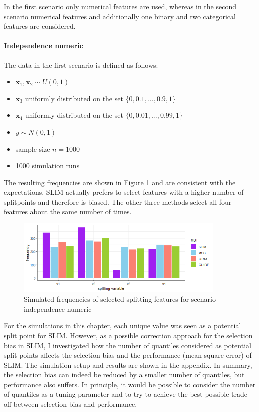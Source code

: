 In the first scenario only numerical features are used, whereas in the second scenario numerical features and additionally one binary and two categorical features are considered.

\paragraph{Independence numeric\\}
The data in the first scenario is defined as follows:
\begin{itemize}
    \item $\textbf{x}_{1}, \textbf{x}_{2} \sim U(0,1)$
    \item $\textbf{x}_3$ uniformly distributed on the set $\{0, 0.1,..., 0.9, 1\}$
    \item $\textbf{x}_4$ uniformly distributed on the set $\{0, 0.01,..., 0.99, 1\}$
    \item $y \sim N(0,1)$
    \item sample size $n = 1000$
    \item 1000 simulation runs
\end{itemize}

The resulting frequencies are shown in Figure \ref{fig:selection_bias_independence_numeric} and are consistent with the expectations. SLIM actually prefers to select features with a higher number of splitpoints and therefore is biased. The other three methods select all four features about the same number of times.

\begin{figure}[!htb]
    \centering
    \includegraphics[width=10cm]{Figures/simulations/batchtools/selection_bias_general/independence_numerical.png}
    \caption{Simulated frequencies of selected splitting features for scenario independence numeric}
    \label{fig:selection_bias_independence_numeric}
\end{figure}

For the simulations in this chapter, each unique value was seen as a potential split point for SLIM.
However, as a possible correction approach for the selection bias in SLIM, I investigated how the number of quantiles considered as potential split points affects the selection bias and the performance (mean square error) of SLIM. The simulation setup and results are shown in the appendix. In summary, the selection bias can indeed be reduced by a smaller number of quantiles, but performance also suffers. In principle, it would be possible to consider the number of quantiles as a tuning parameter and to try to achieve the best possible trade off between selection bias and performance. 



